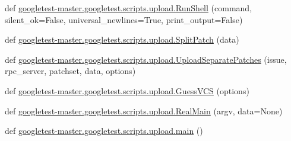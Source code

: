 \begin{DoxyCompactItemize}
def \mbox{\hyperlink{namespacegoogletest-master_1_1googletest_1_1scripts_1_1upload_ab6e7c7fa8d930c338d7fb3658871ad7e}{googletest-\/master.\+googletest.\+scripts.\+upload.\+Run\+Shell}} (command, silent\+\_\+ok=False, universal\+\_\+newlines=True, print\+\_\+output=False)
\item 
def \mbox{\hyperlink{namespacegoogletest-master_1_1googletest_1_1scripts_1_1upload_a90739e461b6862dcee407a71acb26f3d}{googletest-\/master.\+googletest.\+scripts.\+upload.\+Split\+Patch}} (data)
\item 
def \mbox{\hyperlink{namespacegoogletest-master_1_1googletest_1_1scripts_1_1upload_a90629394429ff90c2d4942ea52467426}{googletest-\/master.\+googletest.\+scripts.\+upload.\+Upload\+Separate\+Patches}} (issue, rpc\+\_\+server, patchset, data, options)
\item 
def \mbox{\hyperlink{namespacegoogletest-master_1_1googletest_1_1scripts_1_1upload_aba73ca19bcb0382aac68d9fae8b42c18}{googletest-\/master.\+googletest.\+scripts.\+upload.\+Guess\+V\+CS}} (options)
\item 
def \mbox{\hyperlink{namespacegoogletest-master_1_1googletest_1_1scripts_1_1upload_aea6912f6c8d4ffe5ed77db72b0798481}{googletest-\/master.\+googletest.\+scripts.\+upload.\+Real\+Main}} (argv, data=None)
\item 
def \mbox{\hyperlink{namespacegoogletest-master_1_1googletest_1_1scripts_1_1upload_a3fb6c400f100b1cb693793f801e18928}{googletest-\/master.\+googletest.\+scripts.\+upload.\+main}} ()
\end{DoxyCompactItemize}
